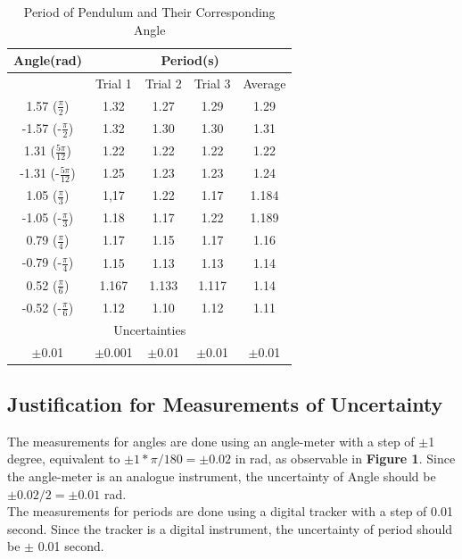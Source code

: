 \documentclass{article}
\begin{document}
\begin{table}[!htb]
\caption{Period of Pendulum and Their Corresponding Angle}
\label{table_angle}
\begin{center}
\begin{tabular}{*5c}
\toprule
	Angle(rad) & \multicolumn{4}{c}{Period(s)}\\
\midrule
	{} & Trial 1 & Trial 2 & Trial 3 & Average\\
	1.57 ($\frac{\pi}{2}$) & 1.32 & 1.27 & 1.29 & 1.29\\
	-1.57 (-$\frac{\pi}{2}$) & 1.32 & 1.30 & 1.30 & 1.31\\
	1.31 ($\frac{5\pi}{12}$) & 1.22 & 1.22 & 1.22 & 1.22\\
	-1.31 (-$\frac{5\pi}{12}$) & 1.25 & 1.23 & 1.23 & 1.24\\
	1.05 ($\frac{\pi}{3}$) & 1,17 & 1.22 & 1.17 & 1.184\\
	-1.05 (-$\frac{\pi}{3}$) & 1.18 & 1.17 & 1.22 & 1.189\\
	0.79 ($\frac{\pi}{4}$) & 1.17 & 1.15 & 1.17 & 1.16\\
	-0.79 (-$\frac{\pi}{4}$)& 1.15 & 1.13 & 1.13 & 1.14\\ 
	0.52 ($\frac{\pi}{6}$) & 1.167 & 1.133 & 1.117 & 1.14\\ 
	-0.52 (-$\frac{\pi}{6}$) & 1.12 & 1.10 & 1.12 & 1.11\\
\midrule
	\multicolumn{5}{c}{Uncertainties}\\
\midrule
	$\pm$0.01 & $\pm$0.001 & $\pm$0.01 & $\pm$0.01 & $\pm$0.01 \\
\bottomrule
\end{tabular}
\end{center}
\end{table}

\subsection{Justification for Measurements of Uncertainty}
The measurements for angles are done using an angle-meter with a step of $\pm$1 degree, equivalent to $\pm 1*\pi/180= \pm0.02$ in rad, as observable in \textbf{Figure 1}. Since the angle-meter is an analogue instrument, the uncertainty of Angle should be $\pm 0.02/2= \pm0.01$ rad.\\

\noindent The measurements for periods are done using a digital tracker with a step of 0.01 second. Since the tracker is a digital instrument, the uncertainty of period should be $\pm$ 0.01 second.
\end{document}
